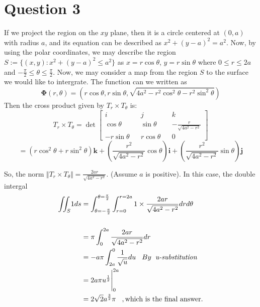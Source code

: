 \documentclass[12pt]{article}
\renewcommand{\vec}[1]{\boldsymbol{#1}}
\begin{document}
\newpage
\section*{Question 3}
If we project the region on the $xy$ plane, then it
is a circle centered at $(0,a)$ 
with radius $a$, and its equation can
be described as $x^2 + (y-a)^2 = a^2$. Now, by using 
the polar coordinates, we may describe the region $S 
:= \lbrace (x,y) : x^2 + (y-a)^2 \leq a^2 \rbrace $ 
as $x = r\cos\theta$, $y = r\sin\theta$ where
$0 \leq r \leq 2a$ and $\displaystyle{-\frac{\pi}{2}
\leq \theta \leq \frac{\pi}{2}}$. Now, we may consider a 
map from the region $S$ to the surface we would like to 
intergrate. The function can we written as
\[ \vec{\Phi}(r,\theta) = (r\cos\theta,r\sin\theta,
\sqrt{4a^2-r^2\cos^2\theta-r^2\sin^2\theta} ) \]
Then the cross product given by $T_r \times T_{\theta}$
is:
\[ T_r \times T_{\theta} = \det
\begin{bmatrix}
i & &  j & & k \\
\cos\theta & & \sin\theta & & \displaystyle{-\frac{r}{\sqrt{4a^2-r^2}}} \\
-r\sin\theta & & r\cos\theta & & 0
\end{bmatrix} \]
\[= (r\cos^2\theta + r\sin^2\theta)\vec k
+ (\displaystyle{\frac{r^2}{\sqrt{4a^2-r^2}}\cos\theta})
\vec i + (\displaystyle{\frac{r^2}{\sqrt{4a^2-r^2}}\sin\theta})
\vec j\]

So, the norm $\Vert T_r \times T_{\theta} \Vert = 
\displaystyle{\frac{2ar}{\sqrt{4a^2-r^2}}}$. 
(Assume $a$ is positive). In this case,
the double intergal 
\begin{align*}
\displaystyle{\iint_S} 1 ds
&= \int_{\theta = -\frac{\pi}{2}}^{\theta = \frac{\pi}{2}} \int_{r=0}^{r=2a} 1 \times 
\frac{2ar}{\sqrt{4a^2-r^2}} drd\theta \\
& \\
&= \pi \int_{0}^{2a} \displaystyle{\frac{2ar}{\sqrt{4a^2-r^2}}dr}\\
&= -a\pi \int_{2a}^{0} \frac{1}{\sqrt{u}} du \hspace*{0.3cm} By \hspace*{0.2cm} \textit{u-substitution} \\
&= \displaystyle{2a\pi u^{\frac{1}{2}}\Bigg|^{2a}_{0}} \\
&= 2\sqrt{2}a^{\frac{3}{2}}\pi \hspace*{0.3cm}, \text{which is the final answer}.
\end{align*}

\newpage
\end{document}
